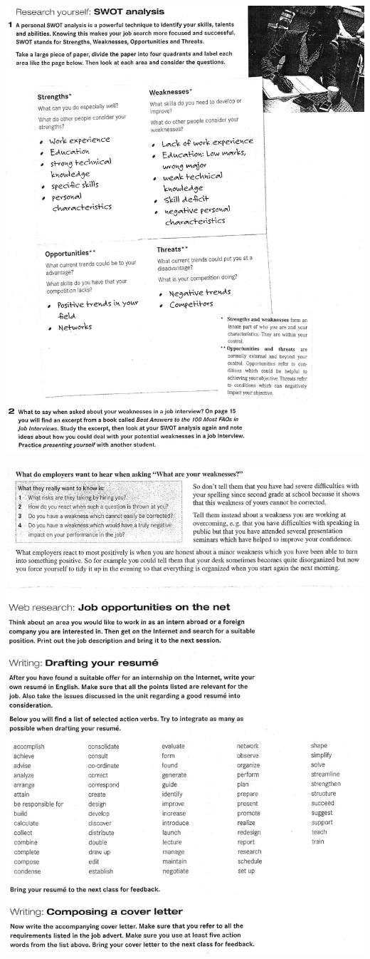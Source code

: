 \includegraphics[scale=.85]{handouts/Eng410.jpg}

\includegraphics[scale=.85]{handouts/Eng408.jpg}

